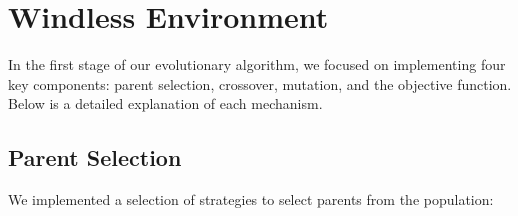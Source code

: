 \documentclass[a4paper, 12pt, fleqn]{report}
\begin{document}
\newpage
\section*{\fontsize{16}{20}\selectfont Windless Environment}

In the first stage of our evolutionary algorithm, we focused on implementing four key components: parent selection, crossover, 
mutation, and the objective function. Below is a detailed explanation of each mechanism.


\subsection*{Parent Selection}

We implemented a selection of strategies to select parents from the population:
\end{document}
